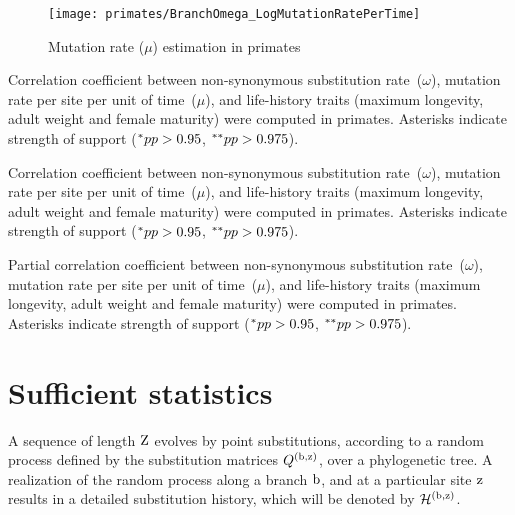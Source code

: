 \begin{figure}[H]
    \centering
    \texttt{[image: primates/BranchOmega\_LogMutationRatePerTime]}
    \caption[$\mu$ estimation in primates]{Mutation rate ($\mu$) estimation in primates}
\end{figure}

\begin{table}[H]
    
    \caption[Correlation coefficient matrix in primates ($\omega$)]{
        Correlation coefficient between {non-synonymous} {substitution} rate~($\omega$), mutation rate per site per unit of time~($\mu$), and life-history traits (maximum longevity, adult weight and female maturity) were computed in primates.
        Asterisks indicate strength of support ($\smash{^{*}} pp > 0.95$, $\smash{^{**}} pp > 0.975$).}
\end{table}

\begin{table}[H]
    
    \caption[Covariance matrix in primates ($\omega$)]{
        Correlation coefficient between {non-synonymous} {substitution} rate~($\omega$), mutation rate per site per unit of time~($\mu$), and life-history traits (maximum longevity, adult weight and female maturity) were computed in primates.
        Asterisks indicate strength of support ($\smash{^{*}} pp > 0.95$, $\smash{^{**}} pp > 0.975$).}
\end{table}

\begin{table}[H]
    
    \caption[Partial correlation coefficient matrix in primates ($\omega$)]{
        Partial correlation coefficient between {non-synonymous} {substitution} rate~($\omega$), mutation rate per site per unit of time~($\mu$), and life-history traits (maximum longevity, adult weight and female maturity) were computed in primates.
        Asterisks indicate strength of support ($\smash{^{*}} pp > 0.95$, $\smash{^{**}} pp > 0.975$).}
\end{table}

\section{Sufficient statistics}
\label{sec:sufficient-statistics-mutselne}

A sequence of length $\text{Z}$ evolves by point substitutions, according to a random process defined by the {substitution} matrices $Q^{(\text{b}, \text{z})}$, over a phylogenetic tree.
A realization of the random process along a branch $\text{b}$, and at a particular site $\text{z}$ results in a detailed {substitution} history, which will be denoted by $\mathcal{H}^{(\text{b}, \text{z})}$.

